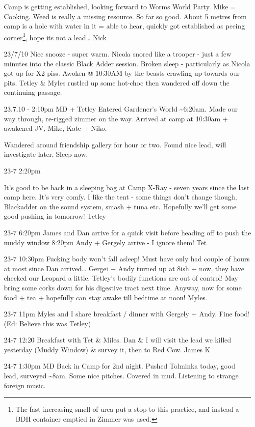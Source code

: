 Camp is getting established, looking forward to Worms World Party. Mike
= Cooking. Weed is really a missing resource. So far so good. About 5
metres from camp is a hole with water in it = able to hear, quickly got
established as peeing
corner\footnote{The fast increasing smell of urea put a stop to this practice, and instead a BDH container emptied in Zimmer was used.},
hope its not a lead\ldots{} Nick

23/7/10 Nice snooze - super warm. Nicola snored like a trooper - just a
few minutes into the classic Black Adder session. Broken sleep -
particularly as Nicola got up for X2 piss. Awoken @ 10:30AM by the
beasts crawling up towards our pits. Tetley \& Myles rustled up some
hot-choc then wandered off down the continuing passage.

23.7.10 - 2:10pm MD + Tetley Entered Gardener's World
\textasciitilde{}6:20am. Made our way through, re-rigged zimmer on the
way. Arrived at camp at 10:30am + awakened JV, Mike, Kate + Niko.

Wandered around friendship gallery for hour or two. Found nice lead,
will investigate later. Sleep now.

23-7 2:20pm

It's good to be back in a sleeping bag at Camp X-Ray - seven years since
the last camp here. It's very comfy. I like the tent - some things don't
change though, Blackadder on the sound system, smash + tuna etc.
Hopefully we'll get some good pushing in tomorrow! Tetley

23-7 6:20pm James and Dan arrive for a quick visit before heading off to
push the muddy window 8:20pm Andy + Gergely arrive - I ignore them! Tet

23-7 10:30pm Fucking body won't fall asleep! Must have only had couple
of hours at most since Dan arrived\ldots{} Gergei + Andy turned up at
8ish + now, they have checked our Leopard a little. Tetley's bodily
functions are out of control! May bring some corks down for his
digestive tract next time. Anyway, now for some food + tea + hopefully
can stay awake till bedtime at noon! Myles.

23-7 11pm Myles and I share breakfast / dinner with Gergely + Andy. Fine
food! (Ed: Believe this was Tetley)

24-7 12:20 Breakfast with Tet \& Miles. Dan \& I will visit the lead we
killed yesterday (Muddy Window) \& survey it, then to Red Cow. James K

24-7 1:30pm MD Back in Camp for 2nd night. Pushed Tolminka today, good
lead, surveyed \textasciitilde{}8am. Some nice pitches. Covered in mud.
Listening to strange foreign music.

